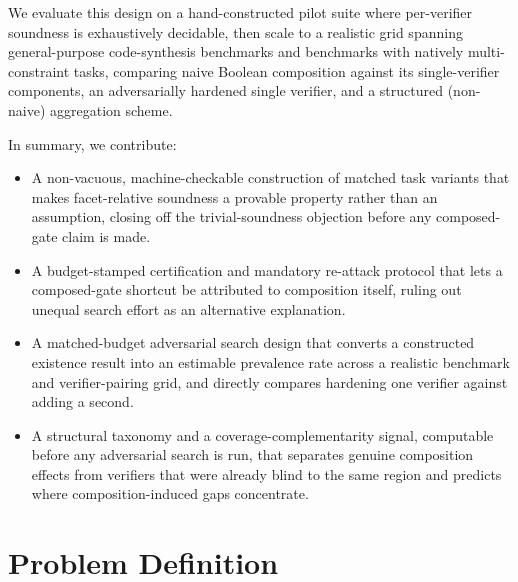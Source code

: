 \documentclass[11pt]{article}
\begin{document}
We evaluate this design on a hand-constructed pilot suite where per-verifier soundness is exhaustively decidable, then scale to a realistic grid spanning general-purpose code-synthesis benchmarks and benchmarks with natively multi-constraint tasks, comparing naive Boolean composition against its single-verifier components, an adversarially hardened single verifier, and a structured (non-naive) aggregation scheme.

In summary, we contribute:
\begin{itemize}[leftmargin=1.4em]
\item A non-vacuous, machine-checkable construction of matched task variants that makes facet-relative soundness a provable property rather than an assumption, closing off the trivial-soundness objection before any composed-gate claim is made.
\item A budget-stamped certification and mandatory re-attack protocol that lets a composed-gate shortcut be attributed to composition itself, ruling out unequal search effort as an alternative explanation.
\item A matched-budget adversarial search design that converts a constructed existence result into an estimable prevalence rate across a realistic benchmark and verifier-pairing grid, and directly compares hardening one verifier against adding a second.
\item A structural taxonomy and a coverage-complementarity signal, computable before any adversarial search is run, that separates genuine composition effects from verifiers that were already blind to the same region and predicts where composition-induced gaps concentrate.
\end{itemize}

\section{Problem Definition}
\end{document}
